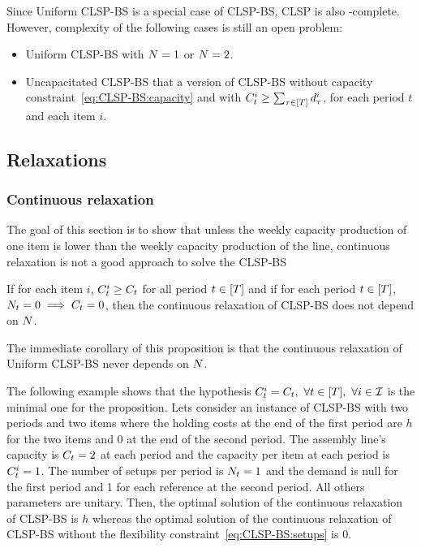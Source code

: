 Since Uniform CLSP-BS is a special case of CLSP-BS, CLSP is also \NP-complete. However, complexity of the following cases is still an open problem:
\begin{itemize}
\item Uniform CLSP-BS with $N=1$ or $N=2$.
\item Uncapacitated CLSP-BS that a version of CLSP-BS without capacity constraint~\eqref{eq:CLSP-BS:capacity} and with $\capacity_t^i\ge\sum_{\tau\in\range{\horizon}}\demand_{\tau}^i$, for each period $t$ and each item $i$.
\end{itemize}



\subsection{Relaxations}

\subsubsection{Continuous relaxation}

The goal of this section is to show that unless the weekly capacity production of one item is lower than the weekly capacity production of the line, continuous relaxation is not a good approach to solve the CLSP-BS

\begin{prop}\label{prop:relaxation-independant-N}
If for each item $i$, $C_t^i\ge C_t$ for all period $t\in\range{\horizon}$ and if for each period $t\in\range{\horizon}$, $N_t=0\implies C_t=0$, then the continuous relaxation of CLSP-BS does not depend on $N$.
\end{prop}

The immediate corollary of this proposition is that the continuous relaxation of Uniform CLSP-BS never depends on $N$.


The following example shows that the hypothesis $\capacity_t^i=\capacity_t,\ \forall t\in\range{\horizon},\ \forall i\in\REF$ is the minimal one for the proposition. Lets consider an instance of CLSP-BS  with two periods and two items where the holding costs at the end of the first period are $h$ for the two items and 0 at the end of the second period. The assembly line's capacity is $C_t=2$ at each period and the capacity per item at each period is $C_t^i=1$. The number of setups per period is $N_t=1$ and the demand is null for the first period and 1 for each reference at the second period. All others parameters are unitary. Then, the optimal solution of the continuous relaxation of CLSP-BS is $h$ whereas the optimal solution of the continuous relaxation of CLSP-BS without the flexibility constraint~\eqref{eq:CLSP-BS:setups} is 0.

